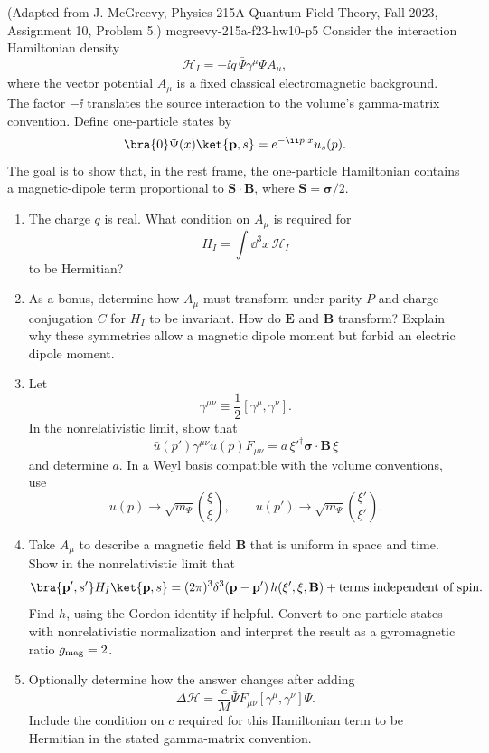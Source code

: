 \begin{enumerate}
  {(Adapted from J. McGreevy, Physics 215A Quantum Field Theory, Fall 2023, Assignment 10, Problem 5.)}
  {mcgreevy-215a-f23-hw10-p5}
Consider the interaction Hamiltonian density
\[
 \mathcal H_I=-\ii q\,\bar\Psi\gamma^\mu\Psi A_\mu,
\]
where the vector potential \(A_\mu\) is a fixed classical
electromagnetic background.  The factor \(-\ii\) translates the source
interaction to the volume's gamma-matrix convention.  Define
one-particle states by
\[
 \bra{0}\Psi(x)\ket{\mathbf p,s}
 =e^{-\ii p\cdot x}u_s(p).
\]
The goal is to show that, in the rest frame, the one-particle
Hamiltonian contains a magnetic-dipole term proportional to
\(\mathbf S\cdot\mathbf B\), where
\(\mathbf S=\boldsymbol\sigma/2\).
\begin{enumerate}
\item
The charge \(q\) is real.  What condition on \(A_\mu\) is required for
\[
 H_I=\int \dd^3x\,\mathcal H_I
\]
to be Hermitian?
\item
As a bonus, determine how \(A_\mu\) must transform under parity \(P\)
and charge conjugation \(C\) for \(H_I\) to be invariant.  How do
\(\mathbf E\) and \(\mathbf B\) transform?  Explain why these symmetries
allow a magnetic dipole moment but forbid an electric dipole moment.
\item
Let
\[
 \gamma^{\mu\nu}\equiv\frac12[\gamma^\mu,\gamma^\nu].
\]
In the nonrelativistic limit, show that
\[
 \bar u(p')\gamma^{\mu\nu}u(p)F_{\mu\nu}
 =a\,\xi'^\dagger\boldsymbol\sigma\cdot\mathbf B\,\xi
\]
and determine \(a\).  In a Weyl basis compatible with the volume
conventions, use
\[
 u(p)\longrightarrow\sqrt{m_\Psi}\binom{\xi}{\xi},
 \qquad
 u(p')\longrightarrow\sqrt{m_\Psi}\binom{\xi'}{\xi'}.
\]
\item
Take \(A_\mu\) to describe a magnetic field \(\mathbf B\) that is
uniform in space and time.  Show in the nonrelativistic limit that
\[
 \bra{\mathbf p',s'}H_I\ket{\mathbf p,s}
 =(2\pi)^3\delta^3(\mathbf p-\mathbf p')\,
 h(\xi',\xi,\mathbf B)
 +\text{terms independent of spin}.
\]
Find \(h\), using the Gordon identity if helpful.  Convert to
one-particle states with nonrelativistic normalization and interpret
the result as a gyromagnetic ratio \(g_{\rm mag}=2\).
\item
Optionally determine how the answer changes after adding
\[
 \Delta\mathcal H
 =\frac{c}{M}\bar\Psi F_{\mu\nu}
 [\gamma^\mu,\gamma^\nu]\Psi.
\]
Include the condition on \(c\) required for this Hamiltonian term to be
Hermitian in the stated gamma-matrix convention.
\end{enumerate}


\end{enumerate}
